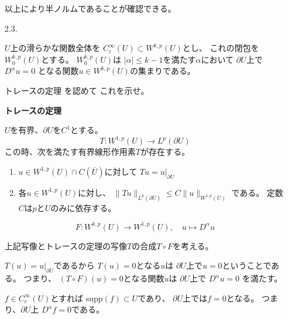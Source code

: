 \documentclass[12pt,b5paper]{ltjsarticle}
\begin{document}
\begin{enumerate}
       以上により半ノルムであることが確認できる。

       \hrulefill

 \item [2.3.]

       $U$上の滑らかな関数全体を
       $C^{\infty}_{c}(U) \subset W^{k,p}(U)$とし、
       これの閉包を$W_{0}^{k,p}(U)$とする。
       $W_{0}^{k,p}(U)$は
       $\lvert \alpha \rvert \leq k-1$を満たす$\alpha$において
       $\partial U$上で
       $D^{\alpha}u =0$
       となる関数$u\in W^{k,p}(U)$の集まりである。

       トレースの定理
       を認めて
       これを示せ。


       \textbf{トレースの定理}

       $U$を有界、$\partial U$を$C^{1}$とする。
       \begin{equation}
        T : W^{1,p}(U) \to L^{p}(\partial U)
       \end{equation}
       この時、次を満たす有界線形作用素$T$が存在する。
       \begin{enumerate}
        \item
             $u\in W^{1,p}(U) \cap C(\overline{U})$に対して
             $Tu = u|_{\partial U}$

        \item
             各$u\in W^{1,p}(U)$に対し、
             $\| Tu \|_{L^{p}(\partial U)} \leq C \| u \|_{W^{1,p}(U)}$
             である。
             定数$C$は$p$と$U$のみに依存する。

       \end{enumerate}

       \dotfill


       \begin{equation}
        F : W^{k,p}(U) \to W^{1,p}(U)
         ,\quad
         u \mapsto D^{\alpha}u
       \end{equation}

       上記写像とトレースの定理の写像$T$の合成$T\circ F$を考える。


       $T(u) = u|_{\partial U}$であるから
       $T(u)=0$となる$u$は
       $\partial U$上で$u=0$ということである。
       つまり、
       $(T\circ F)(u)=0$となる関数$u$は
       $\partial U$上で
       $D^{\alpha}u=0$
       を満たす。

       $f\in C^{\infty}_{c}(U)$とすれば
       $\mathrm{supp}(f) \subset U$であり、
       $\partial U$上では$f=0$となる。
       つまり、$\partial U$上
       $D^{\alpha}f=0$である。


\end{enumerate}
\end{document}
